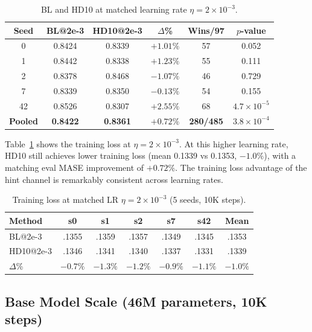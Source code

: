 \documentclass[11pt]{article}
\begin{document}
\begin{table}[h]
\centering
\caption{BL and HD10 at matched learning rate $\eta = 2 \times 10^{-3}$.}
\small
\begin{tabular}{cccccc}
\toprule
\textbf{Seed} & \textbf{BL@2e-3} & \textbf{HD10@2e-3} & \textbf{$\Delta$\%} & \textbf{Wins/97} & \textbf{$p$-value} \\
\midrule
0 & 0.8424 & 0.8339 & $+1.01\%$ & 57 & 0.052 \\
1 & 0.8442 & 0.8338 & $+1.23\%$ & 55 & 0.111 \\
2 & 0.8378 & 0.8468 & $-1.07\%$ & 46 & 0.729 \\
7 & 0.8339 & 0.8350 & $-0.13\%$ & 54 & 0.155 \\
42 & 0.8526 & 0.8307 & $+2.55\%$ & 68 & $4.7 \times 10^{-5}$ \\
\midrule
\textbf{Pooled} & \textbf{0.8422} & \textbf{0.8361} & $+0.72\%$ & \textbf{280/485} & $3.8 \times 10^{-4}$ \\
\bottomrule
\end{tabular}
\end{table}

Table~\ref{tab:trainloss_matchedlr} shows the training loss at $\eta = 2 \times 10^{-3}$. At this higher learning rate, HD10 still achieves lower training loss (mean 0.1339 vs 0.1353, $-1.0\%$), with a matching eval MASE improvement of $+0.72\%$. The training loss advantage of the hint channel is remarkably consistent across learning rates.

\begin{table}[h]
\centering
\caption{Training loss at matched LR $\eta = 2 \times 10^{-3}$ (5 seeds, 10K steps).}
\label{tab:trainloss_matchedlr}
\small
\begin{tabular}{lcccccc}
\toprule
\textbf{Method} & \textbf{s0} & \textbf{s1} & \textbf{s2} & \textbf{s7} & \textbf{s42} & \textbf{Mean} \\
\midrule
BL@2e-3 & .1355 & .1359 & .1357 & .1349 & .1345 & .1353 \\
HD10@2e-3 & .1346 & .1341 & .1340 & .1337 & .1331 & .1339 \\
\midrule
$\Delta$\% & $-0.7\%$ & $-1.3\%$ & $-1.2\%$ & $-0.9\%$ & $-1.1\%$ & $-1.0\%$ \\
\bottomrule
\end{tabular}
\end{table}

\subsection{Base Model Scale (46M parameters, 10K steps)}
\end{document}
